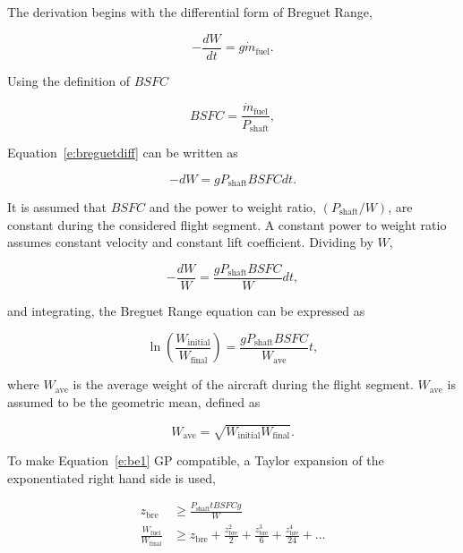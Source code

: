 \documentclass[]{aiaa-tc}%
\begin{document}
The derivation begins with the differential form of Breguet Range,\cite{br2}

\begin{equation}
    \label{e:breguetdiff}
    -\frac{dW}{dt} = g\dot{m}_{\text{fuel}}.
\end{equation}

Using the definition of $BSFC$

\begin{equation}
    \label{e:brBSFC}
    BSFC = \frac{\dot{m}_{\text{fuel}}}{P_{\text{shaft}}},
\end{equation}

Equation~\eqref{e:breguetdiff} can be written as

\begin{equation}
    \label{e:brdiff2}
    -dW = g P_{\text{shaft}} BSFC dt.
\end{equation}

It is assumed that $BSFC$ and the power to weight ratio, $(P_{\text{shaft}}/W)$, are constant during the considered flight segment. 
A constant power to weight ratio assumes constant velocity and constant lift coefficient.\cite{br2}
Dividing by $W$,

\begin{equation}
    \label{e:brdiff2}
    -\frac{dW}{W} = \frac{g P_{\text{shaft}}BSFC }{W} dt,
\end{equation}

and integrating, the Breguet Range equation can be expressed as

\begin{equation}
    \label{e:be1}
    \ln{\left( \frac{W_{\text{initial}}}{W_{\text{final}}} \right)} = \frac{gP_{\text{shaft}}BSFC}{W_{\text{ave}}} t,
\end{equation}

where $W_{\text{ave}}$ is the average weight of the aircraft during the flight segment.  $W_{\text{ave}}$ is assumed to be the geometric mean, defined as

\begin{equation}
    \label{e:gpmean}
    W_{\text{ave}} = \sqrt{W_{\text{initial}}W_{\text{final}}}.
\end{equation}

    To make Equation~\eqref{e:be1} GP compatible, a Taylor expansion of the exponentiated right hand side is used,\cite{hoburgthesis}

\begin{align}
    \label{e:brzbre}
    z_{\text{bre}} &\geq \frac{P_{\text{shaft}}t BSFC g}{W}\\
    \label{e:brtaylor}
    \frac{W_{\text{fuel}}}{W_\text{final}} &\geq z_{\text{bre}} + \frac{z_{\text{bre}}^2}{2} + \frac{z_{\text{bre}}^3}{6} + \frac{z_{\text{bre}}^4}{24} + \dots
\end{align}
\end{document}
